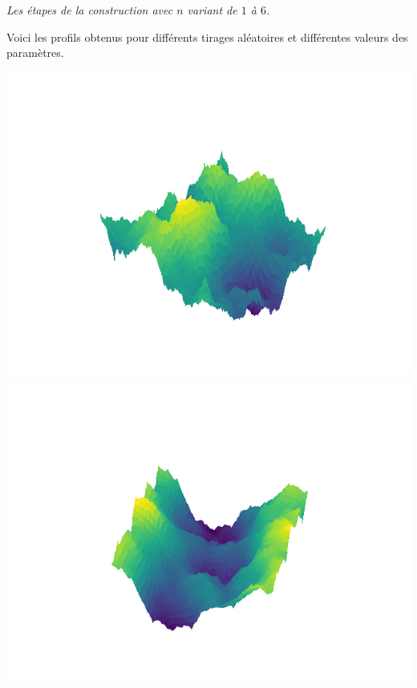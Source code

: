 \documentclass[11pt,class=report,crop=false]{standalone}
\begin{document}
\begin{exemple}
\begin{center}
\nopagebreak

\begin{minipage}{0.8\textwidth}
\center\emph{
Les étapes de la construction avec $n$ variant de $1$ à $6$.}
\end{minipage}

\end{center}


\end{exemple}


\begin{exemple}
Voici les profils obtenus pour différents tirages aléatoires et différentes valeurs des paramètres.

\begin{center}
\includegraphics[scale=\myscale,scale=0.3]{figures/diamant-carre-02-1}
\includegraphics[scale=\myscale,scale=0.3]{figures/diamant-carre-02-2}

\end{center}
\end{exemple}
\end{document}
